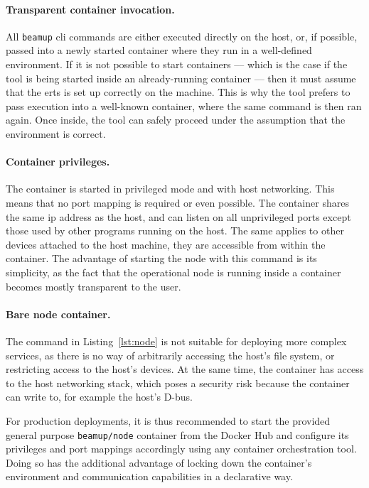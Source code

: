 \paragraph{Transparent container invocation.}
All \lstinline|beamup| \acrshort{cli} commands are either executed directly on the host, or, if possible, passed into a newly started container where they run in a well-defined environment. If it is not possible to start containers –– which is the case if the tool is being started inside an already-running container –– then it must assume that the \acrshort{erts} is  set up correctly on the machine. This is why the tool prefers to pass execution into a well-known container, where the same command is then ran again. Once inside, the tool can safely proceed under the assumption that the environment is correct.~\cite{zak18}


\paragraph{Container privileges.}
The container is started in privileged mode and with host networking. This means that no port mapping is required or even possible. The container shares the same \acrshort{ip} address as the host, and can listen on all unprivileged ports except those used by other programs running on the host. The same applies to other devices attached to the host machine, they are accessible from within the container. The advantage of starting the node with this command is its simplicity, as the fact that the operational node is running inside a container becomes mostly transparent to the user.

\paragraph{Bare node container.}
The command in Listing~\ref{lst:node} is not suitable for deploying more complex services, as there is no way of arbitrarily accessing the host's file system, or restricting access to the host's devices. At the same time, the container has access to the host networking stack, which poses a security risk because the container can write to, for example the host's D-bus.~\cite{docker:docs}

For production deployments, it is thus recommended to start the provided general purpose \lstinline|beamup/node| container from the Docker Hub and configure its privileges and port mappings accordingly using any container orchestration tool. Doing so has the additional advantage of locking down the container's environment and communication capabilities in a declarative way.

